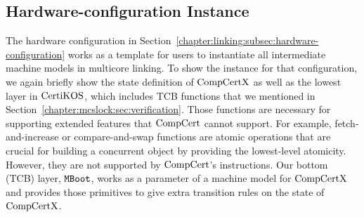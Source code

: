 
\subsection{Hardware-configuration Instance}
\label{chapter:certikos:subsec:hardware-configuration-instance}

The hardware configuration in Section~\ref{chapter:linking:subsec:hardware-configuration} works as a 
template for users to instantiate all intermediate machine models in multicore linking. 
To show the instance for that configuration,
we again briefly show the state definition of $\mathrm{CompCertX}$
as well as the lowest layer in $\mathrm{CertiKOS}$, which includes TCB functions that we mentioned in Section~\ref{chapter:mcslock:sec:verification}.
Those functions are 
necessary for supporting extended features that $\mathrm{CompCert}$ cannot support. 
For example, 
fetch-and-increase or compare-and-swap functions are atomic operations that are crucial for building a 
concurrent object by providing the lowest-level atomicity. 
However, they are not supported by $\mathrm{CompCert}$'s instructions.
Our bottom (TCB) layer, ${\mathrm{\texttt{MBoot}}}$, works as a parameter of a machine model for $\mathrm{CompCertX}$ 
and provides those  primitives to give  extra transition rules on the state of $\mathrm{CompCertX}$.
%
%



